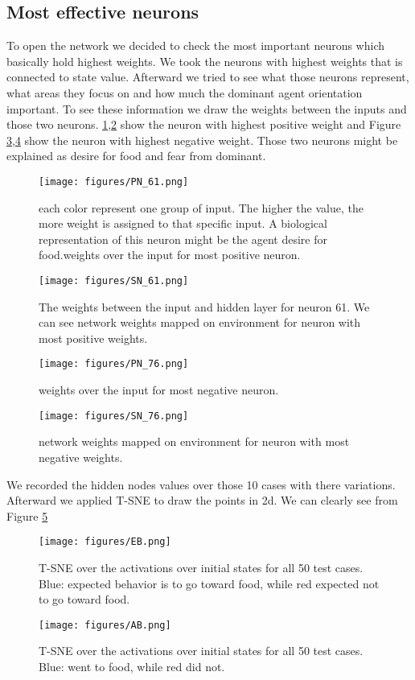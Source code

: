 \documentclass{article}
\begin{document}
\subsection{Most effective neurons}
To open the network we decided to check the most important neurons which basically hold highest weights. We took the neurons with highest weights that is connected to state value. Afterward we tried to see what those neurons represent, what areas they focus on and how much the dominant agent orientation important. To see these information we draw the weights between the inputs and those two neurons. \ref{fig.PN_61},\ref{fig.SN_61} show the neuron with highest positive weight and Figure \ref{fig.PN_76},\ref{fig.SN_76} show the neuron with highest negative weight. Those two neurons might be explained as desire for food and fear from dominant. 
\begin{figure}[H]
\texttt{[image: figures/PN\_61.png]}
\caption{each color represent one group of input. The higher the value, the more weight is assigned to that specific input. A biological representation of this neuron might be the agent desire for food.weights over the input for most positive neuron.}
\label{fig.PN_61}
\end{figure}
\begin{figure}[H]
\texttt{[image: figures/SN\_61.png]}
\caption{The weights between the input and hidden layer for neuron 61. We can see network weights mapped on environment for neuron with most
positive weights.}
\label{fig.SN_61}
\end{figure}
\begin{figure}[H]
\texttt{[image: figures/PN\_76.png]}
\caption{weights over the input for most negative neuron.}
\label{fig.PN_76}
\end{figure}
\begin{figure}[H]
\texttt{[image: figures/SN\_76.png]}
\caption{network weights mapped on environment for neuron with most negative weights.}
\label{fig.SN_76}
\end{figure}
We recorded the hidden nodes values over those 10 cases with there variations. Afterward we applied T-SNE to draw the points in 2d. We can clearly see from Figure \ref{fig.expected.behavior}

\begin{figure}[H]
\texttt{[image: figures/EB.png]}
\caption{T-SNE over the activations over initial states for all 50 test cases. Blue: expected behavior is to go toward food, while red expected not to go toward food.}
\label{fig.expected.behavior}
\end{figure}
\begin{figure}[H]
\texttt{[image: figures/AB.png]}
\caption{T-SNE over the activations over initial states for all 50 test cases. Blue: went  to food, while red did not.}
\label{fig.actual.behavior}
\end{figure}
\end{document}
